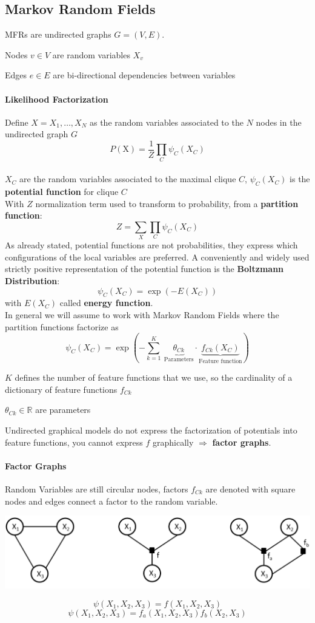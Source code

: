 \documentclass[10pt]{report}
\begin{document}
\subsection{Markov Random Fields}
MFRs are undirected graphs $G = (V, E)$.
\begin{list}{}{}
	\item Nodes $v\in V$ are random variables $X_v$
	\item Edges $e\in E$ are bi-directional dependencies between variables
\end{list}
\paragraph{Likelihood Factorization} Define $X = X_1,\ldots, X_N$ as the random variables associated to the $N$ nodes in the undirected graph $G$
$$P(\text{X}) = \frac{1}{Z}\prod_C \psi_C(X_C)$$\\
$X_C$ are the random variables associated to the maximal clique $C$, $\psi_C(X_C)$ is the \textbf{potential function} for clique $C$\\
With $Z$ normalization term used to transform to probability, from a \textbf{partition function}:
$$Z = \sum_X\prod_C\psi_C(X_C)$$
As already stated, potential functions are not probabilities, they express which configurations of the local variables are preferred. A conveniently and widely used strictly positive representation of the potential function is the \textbf{Boltzmann Distribution}:
$$\psi_C(X_C)=\exp\left(-E(X_C)\right)$$
with $E(X_C)$ called \textbf{energy function}.\\
In general we will assume to work with Markov Random Fields where the partition functions factorize as $$\psi_C(X_C) = \exp\left(-\sum_{k=1}^K\:\underset{\text{Parameters}}{\underbrace{\theta_{Ck}}}\cdot\underset{\text{Feature function}}{\underbrace{f_{Ck}(X_C)}}\right)$$
\begin{list}{}{}
	\item $K$ defines the number of feature functions that we use, so the cardinality of a dictionary of feature functions $f_{Ck}$
	\item $\theta_{Ck}\in\mathbb{R}$ are parameters
\end{list}
Undirected graphical models do not express the factorization of potentials into feature functions, you cannot express $f$ graphically $\Rightarrow$ \textbf{factor graphs}.
\paragraph{Factor Graphs} Random Variables are still circular nodes, factors $f_{Ck}$ are denoted with square nodes and edges connect a factor to the random variable.
\begin{center}
	\includegraphics[scale=0.5]{34.png}
\end{center}
$$\psi(X_1,X_2,X_3) = f(X_1,X_2,X_3)$$
$$\psi(X_1,X_2,X_3) = f_a(X_1,X_2,X_3)f_b(X_2,X_3)$$
\end{document}
